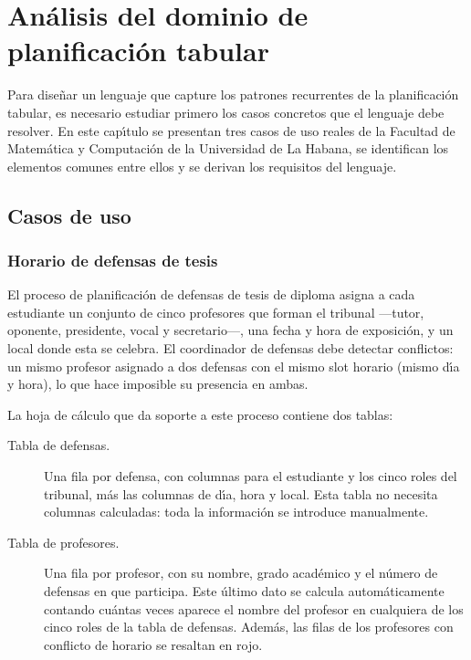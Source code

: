 \chapter{An\'alisis del dominio de planificaci\'on tabular}
\label{cap:dominio}

Para dise\~nar un lenguaje que capture los patrones recurrentes de la
planificaci\'on tabular, es necesario estudiar primero los casos concretos
que el lenguaje debe resolver.  En este cap\'{\i}tulo se presentan tres
casos de uso reales de la Facultad de Matem\'atica y Computaci\'on de la
Universidad de La Habana, se identifican los elementos comunes entre ellos
y se derivan los requisitos del lenguaje.

\section{Casos de uso}
\label{sec:casos}

\subsection{Horario de defensas de tesis}
\label{ssec:caso-defensas}

El proceso de planificaci\'on de defensas de tesis de diploma asigna a cada
estudiante un conjunto de cinco profesores que forman el tribunal ---tutor,
oponente, presidente, vocal y secretario---, una fecha y hora de exposici\'on,
y un local donde esta se celebra.  El coordinador de defensas debe detectar
conflictos: un mismo profesor asignado a dos defensas con el mismo slot
horario (mismo d\'{\i}a y hora), lo que hace imposible su presencia en
ambas.

La hoja de c\'alculo que da soporte a este proceso contiene dos tablas:

\begin{description}
  \item[Tabla de defensas.] Una fila por defensa, con columnas para el
    estudiante y los cinco roles del tribunal, m\'as las columnas de d\'{\i}a,
    hora y local.  Esta tabla no necesita columnas calculadas: toda la
    informaci\'on se introduce manualmente.

  \item[Tabla de profesores.] Una fila por profesor, con su nombre, grado
    acad\'emico y el n\'umero de defensas en que participa.  Este \'ultimo dato
    se calcula autom\'aticamente contando cu\'antas veces aparece el nombre del
    profesor en cualquiera de los cinco roles de la tabla de defensas.
    Adem\'as, las filas de los profesores con conflicto de horario se resaltan
    en rojo.
\end{description}

